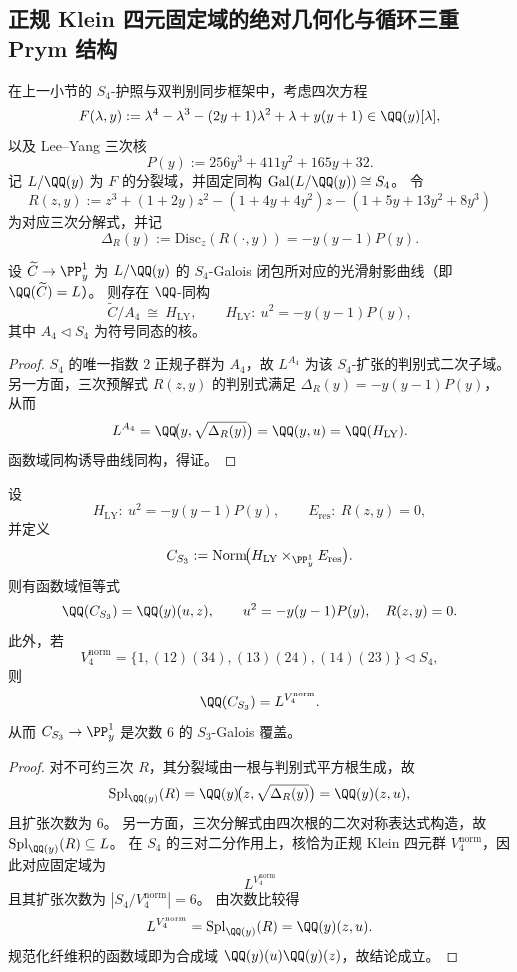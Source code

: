 \subsection{正规 Klein 四元固定域的绝对几何化与循环三重 Prym 结构}\label{subsec:cdim-s4-v4-fixedfield-resolvent-prym}
在上一小节的 \(S_4\)-护照与双判别同步框架中，考虑四次方程
\[
F(\lambda,y)
:=
\lambda^{4}-\lambda^{3}-(2y+1)\lambda^{2}+\lambda+y(y+1)\in \QQ(y)[\lambda],
\]
以及 Lee--Yang 三次核
\[
P(y):=256y^{3}+411y^{2}+165y+32.
\]
记 \(L/\QQ(y)\) 为 \(F\) 的分裂域，并固定同构
\(
\mathrm{Gal}(L/\QQ(y))\cong S_4
\)。
令
\[
R(z,y)
:=
z^{3}+(1+2y)z^{2}-(1+4y+4y^{2})z-(1+5y+13y^{2}+8y^{3})
\]
为对应三次分解式，并记
\[
\Delta_R(y):=\mathrm{Disc}_{z}(R(\cdot,y))=-y(y-1)P(y).
\]

\begin{proposition}\label{prop:cdim-s4-a4-quotient-is-leyang-curve}
设 \(\widetilde C\to\PP^1_y\) 为 \(L/\QQ(y)\) 的 \(S_4\)-Galois 闭包所对应的光滑射影曲线（即 \(\QQ(\widetilde C)=L\)）。
则存在 \(\QQ\)-同构
\[
\widetilde C/A_4\ \cong\ H_{\mathrm{LY}},
\qquad
H_{\mathrm{LY}}:\ u^{2}=-y(y-1)P(y),
\]
其中 \(A_4\triangleleft S_4\) 为符号同态的核。
\end{proposition}
\begin{proof}
\(S_4\) 的唯一指数 \(2\) 正规子群为 \(A_4\)，故 \(L^{A_4}\) 为该 \(S_4\)-扩张的判别式二次子域。
另一方面，三次预解式 \(R(z,y)\) 的判别式满足
\(
\Delta_R(y)=-y(y-1)P(y)
\)，从而
\[
L^{A_4}=\QQ\!\bigl(y,\sqrt{\Delta_R(y)}\bigr)=\QQ(y,u)=\QQ(H_{\mathrm{LY}}).
\]
函数域同构诱导曲线同构，得证。
\end{proof}

\begin{conclusion}\label{con:cdim-s4-v4-fixedfield-fiber-product}
设
\[
H_{\mathrm{LY}}:\ u^{2}=-y(y-1)P(y),\qquad
E_{\mathrm{res}}:\ R(z,y)=0,
\]
并定义
\[
C_{S_3}:=\operatorname{Norm}\!\bigl(H_{\mathrm{LY}}\times_{\PP^1_y}E_{\mathrm{res}}\bigr).
\]
则有函数域恒等式
\[
\QQ(C_{S_3})=\QQ(y)(u,z),\qquad
u^{2}=-y(y-1)P(y),\quad R(z,y)=0.
\]
此外，若
\[
V_{4}^{\mathrm{norm}}
=
\{1,(12)(34),(13)(24),(14)(23)\}\triangleleft S_4,
\]
则
\[
\QQ(C_{S_3})=L^{V_{4}^{\mathrm{norm}}}.
\]
从而 \(C_{S_3}\to\PP^1_y\) 是次数 \(6\) 的 \(S_3\)-Galois 覆盖。
\end{conclusion}
\begin{proof}
对不可约三次 \(R\)，其分裂域由一根与判别式平方根生成，故
\[
\mathrm{Spl}_{\QQ(y)}(R)=\QQ(y)\!\bigl(z,\sqrt{\Delta_R(y)}\bigr)=\QQ(y)(z,u),
\]
且扩张次数为 \(6\)。
另一方面，三次分解式由四次根的二次对称表达式构造，故 \(\mathrm{Spl}_{\QQ(y)}(R)\subseteq L\)。
在 \(S_4\) 的三对二分作用上，核恰为正规 Klein 四元群 \(V_{4}^{\mathrm{norm}}\)，因此对应固定域为
\[
L^{V_{4}^{\mathrm{norm}}}
\]
且其扩张次数为 \(|S_4/V_4^{\mathrm{norm}}|=6\)。
由次数比较得
\[
L^{V_{4}^{\mathrm{norm}}}=\mathrm{Spl}_{\QQ(y)}(R)=\QQ(y)(z,u).
\]
规范化纤维积的函数域即为合成域 \(\QQ(y)(u)\QQ(y)(z)\)，故结论成立。
\end{proof}

